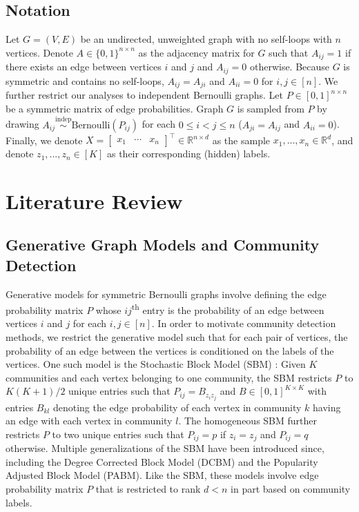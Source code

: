 \documentclass[
  11pt,
]{article}
\begin{document}
\hypertarget{notation}{%
\subsection{Notation}\label{notation}}

Let \(G = (V, E)\) be an undirected, unweighted graph with no self-loops
with \(n\) vertices. Denote \(A \in \{0, 1\}^{n \times n}\) as the
adjacency matrix for \(G\) such that \(A_{ij} = 1\) if there exists an
edge between vertices \(i\) and \(j\) and \(A_{ij} = 0\) otherwise.
Because \(G\) is symmetric and contains no self-loops,
\(A_{ij} = A_{ji}\) and \(A_{ii} = 0\) for \(i, j \in [n]\). We further
restrict our analyses to independent Bernoulli graphs. Let
\(P \in [0, 1]^{n \times n}\) be a symmetric matrix of edge
probabilities. Graph \(G\) is sampled from \(P\) by drawing
\(A_{ij} \stackrel{\text{indep}}{\sim}\text{Bernoulli}(P_{ij})\) for
each \(0 \leq i < j \leq n\) (\(A_{ji} = A_{ij}\) and \(A_{ii} = 0\)).
Finally, we denote
\(X = \begin{bmatrix} x_1 & \cdots & x_n \end{bmatrix}^\top \in \mathbb{R}^{n \times d}\)
as the sample \(x_1, ..., x_n \in \mathbb{R}^d\), and denote
\(z_1, ..., z_n \in [K]\) as their corresponding (hidden) labels.

\hypertarget{literature-review}{%
\section{Literature Review}\label{literature-review}}

\hypertarget{generative-graph-models-and-community-detection}{%
\subsection{Generative Graph Models and Community
Detection}\label{generative-graph-models-and-community-detection}}

Generative models for symmetric Bernoulli graphs involve defining the
edge probability matrix \(P\) whose \(ij\)\textsuperscript{th} entry is
the probability of an edge between vertices \(i\) and \(j\) for each
\(i, j \in [n]\). In order to motivate community detection methods, we
restrict the generative model such that for each pair of vertices, the
probability of an edge between the vertices is conditioned on the labels
of the vertices. One such model is the Stochastic Block Model (SBM)
\cite{doi:10.1080/0022250X.1971.9989788}: Given \(K\) communities and
each vertex belonging to one community, the SBM restricts \(P\) to
\(K (K + 1) / 2\) unique entries such that \(P_{ij} = B_{z_i z_j}\) and
\(B \in [0, 1]^{K \times K}\) with entries \(B_{kl}\) denoting the edge
probability of each vertex in community \(k\) having an edge with each
vertex in community \(l\). The homogeneous SBM further restricts \(P\)
to two unique entries such that \(P_{ij} = p\) if \(z_i = z_j\) and
\(P_{ij} = q\) otherwise. Multiple generalizations of the SBM have been
introduced since, including the Degree Corrected Block Model (DCBM) and
the Popularity Adjusted Block Model (PABM). Like the SBM, these models
involve edge probability matrix \(P\) that is restricted to rank
\(d < n\) in part based on community labels.
\end{document}
